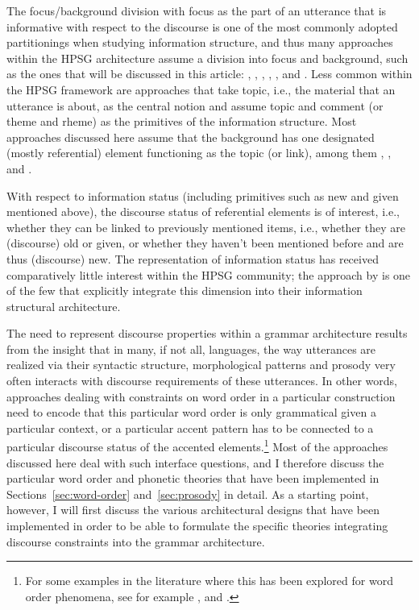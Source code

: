 \documentclass[output=paper,biblatex,babelshorthands,newtxmath,draftmode,colorlinks,citecolor=brown]{langscibook}
\begin{document}
The focus/background division with focus as the part of an utterance
that is informative with respect to the discourse is one of the most
commonly adopted partitionings when studying information structure, and
thus many approaches within the HPSG architecture assume a
division into focus and background, such as the ones that will be
discussed in this article: , ,
, , ,
 and . Less common within the
HPSG framework are approaches that take topic, i.e., the material that
an utterance is about, as the central notion and assume topic and
comment (or theme and rheme) as the primitives of the information
structure. Most approaches discussed here assume that the background
has one designated (mostly referential) element functioning as the
topic (or link), among them , ,
 and .

\largerpage[2]
With respect to information status (including primitives such as new and
given mentioned above), the discourse status of referential elements is of
interest, i.e., whether they can be linked to previously mentioned
items, i.e., whether they are (discourse) old or given, or whether they
haven't been mentioned before and are thus (discourse) new. The
representation of information status has received comparatively little
interest within the HPSG community; the approach by
\citet{DeKuthy.Meurers-11} is one of the few that
explicitly integrate this dimension into their information structural
architecture.

The need to represent discourse properties within a grammar
architecture results from the insight that in many, if not all,
languages, the way utterances are realized via their syntactic
structure, morphological patterns and prosody very often interacts
with discourse requirements of these utterances. In other words,
approaches dealing with constraints on word order in a particular
construction need to encode that this particular word order is only
grammatical given a particular context, or a particular accent pattern
has to be connected to a particular discourse status of the accented
elements.\footnote{For some examples in the literature where this has
  been explored for word order phenomena, see for example
  \citet{ambridge.goldberg-08}, \citet{DeKuthy.Konietzko-19} and
  \citet{Culicover.Winkler-19}. } Most of the approaches discussed
here deal with such interface questions, and I therefore discuss the
particular word order and phonetic theories that have been implemented
in Sections~\ref{sec:word-order} and~\ref{sec:prosody} in detail. As a
starting point, however, I will first discuss the various
architectural designs that have been implemented in order to be able
to formulate the specific theories integrating discourse constraints
into the grammar architecture.
\end{document}
